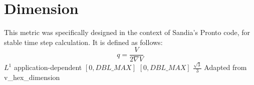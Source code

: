 \section{Dimension} 

This metric was specifically designed in the context of
Sandia's \textsf{Pronto} code, for stable time step calculation. It is
defined as follows:
\[
q = \frac{V}{2\nabla{V}}
\]
%
{$L^1$}%
{application-dependent}%
{$[0,DBL\_MAX]$}%
{$[0,DBL\_MAX]$}%
{$\frac{\sqrt{3}}{3}$}%
{Adapted from \cite{tf:89}}%
{v\_hex\_dimension}%
